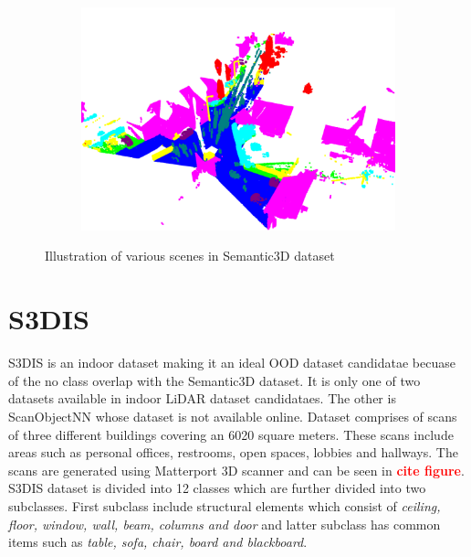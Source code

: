 \begin{figure}[h!]
\begin{subfigure}{0.45\textwidth}
        \caption{}
    \end{subfigure} 
    \begin{subfigure}{0.45\textwidth}
        \centering
        \includegraphics[scale=0.28, angle=90]{images/Untermaederbrunnen3.png}
        \caption{}
    \end{subfigure}
    \caption{Illustration of various scenes in Semantic3D dataset}
    \label{fig:sem3d_gt_vis}
\end{figure}
\newpage
\section{S3DIS}
S3DIS is an indoor dataset making it an ideal OOD dataset candidatae becuase of the no class overlap with the Semantic3D dataset.
It is only one of two datasets available in indoor LiDAR dataset candidataes. 
The other is ScanObjectNN whose dataset is not available online.
Dataset comprises of scans of three different buildings covering an 6020 square meters.
These scans include areas such as personal offices, restrooms, open spaces, lobbies and hallways.
The scans are generated using Matterport 3D scanner and can be seen in \textcolor{red}{\textbf{cite figure}}.
S3DIS dataset is divided into 12 classes which are further divided into two subclasses.
First subclass include structural elements which consist of \textit{ceiling, floor, window, wall, beam, columns and door}
and latter subclass has common items such as \textit{table, sofa, chair, board and blackboard}.
